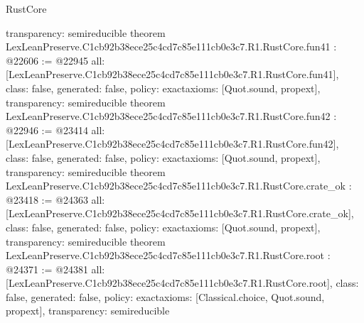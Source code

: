 \begin{lexlean}{RustCore}
\begin{coremodule}
{  transparency: semireducible
}
theorem LexLeanPreserve.C1cb92b38ece25c4cd7c85e111cb0e3c7.R1.RustCore.fun41 : @22606 := @22945 {
  all: [LexLeanPreserve.C1cb92b38ece25c4cd7c85e111cb0e3c7.R1.RustCore.fun41],
  class: false,
  generated: false,
  policy: exact{axioms: [Quot.sound, propext]},
  transparency: semireducible
}
theorem LexLeanPreserve.C1cb92b38ece25c4cd7c85e111cb0e3c7.R1.RustCore.fun42 : @22946 := @23414 {
  all: [LexLeanPreserve.C1cb92b38ece25c4cd7c85e111cb0e3c7.R1.RustCore.fun42],
  class: false,
  generated: false,
  policy: exact{axioms: [Quot.sound, propext]},
  transparency: semireducible
}
theorem LexLeanPreserve.C1cb92b38ece25c4cd7c85e111cb0e3c7.R1.RustCore.crate_ok : @23418 := @24363 {
  all: [LexLeanPreserve.C1cb92b38ece25c4cd7c85e111cb0e3c7.R1.RustCore.crate_ok],
  class: false,
  generated: false,
  policy: exact{axioms: [Quot.sound, propext]},
  transparency: semireducible
}
theorem LexLeanPreserve.C1cb92b38ece25c4cd7c85e111cb0e3c7.R1.RustCore.root : @24371 := @24381 {
  all: [LexLeanPreserve.C1cb92b38ece25c4cd7c85e111cb0e3c7.R1.RustCore.root],
  class: false,
  generated: false,
  policy: exact{axioms: [Classical.choice, Quot.sound, propext]},
  transparency: semireducible
}


\end{coremodule}
\end{lexlean}
